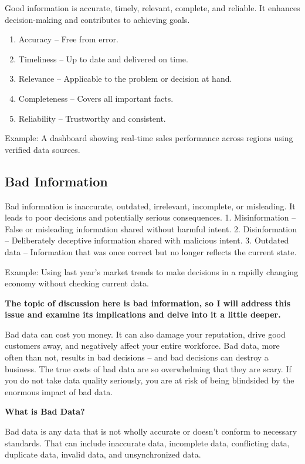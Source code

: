 \documentclass[
  man,
  floatsintext,
  longtable,
  nolmodern,
  notxfonts,
  notimes,
  colorlinks=true,linkcolor=blue,citecolor=blue,urlcolor=blue]{apa7}
\providecommand{\tightlist}{%
  \setlength{\itemsep}{0pt}\setlength{\parskip}{0pt}}
\begin{document}
Good information is accurate, timely, relevant, complete, and reliable.
It enhances decision-making and contributes to achieving goals.

\begin{enumerate}
\def\labelenumi{\arabic{enumi}.}
\tightlist
\item
  Accuracy -- Free from error.
\item
  Timeliness -- Up to date and delivered on time.
\item
  Relevance -- Applicable to the problem or decision at hand.
\item
  Completeness -- Covers all important facts.
\item
  Reliability -- Trustworthy and consistent.
\end{enumerate}

Example: A dashboard showing real-time sales performance across regions
using verified data sources.

\subsection{Bad Information}\label{bad-information}

Bad information is inaccurate, outdated, irrelevant, incomplete, or
misleading. It leads to poor decisions and potentially serious
consequences. 1. Misinformation -- False or misleading information
shared without harmful intent. 2. Disinformation -- Deliberately
deceptive information shared with malicious intent. 3. Outdated data --
Information that was once correct but no longer reflects the current
state.

Example: Using last year's market trends to make decisions in a rapidly
changing economy without checking current data.

\textbf{The topic of discussion here is bad information, so I will
address this issue and examine its implications and delve into it a
little deeper.}

Bad data can cost you money. It can also damage your reputation, drive
good customers away, and negatively affect your entire workforce. Bad
data, more often than not, results in bad decisions -- and bad decisions
can destroy a business. The true costs of bad data are so overwhelming
that they are scary. If you do not take data quality seriously, you are
at risk of being blindsided by the enormous impact of bad data.

\textbf{What is Bad Data?}

Bad data is any data that is not wholly accurate or doesn't conform to
necessary standards. That can include inaccurate data, incomplete data,
conflicting data, duplicate data, invalid data, and unsynchronized data.
\end{document}
